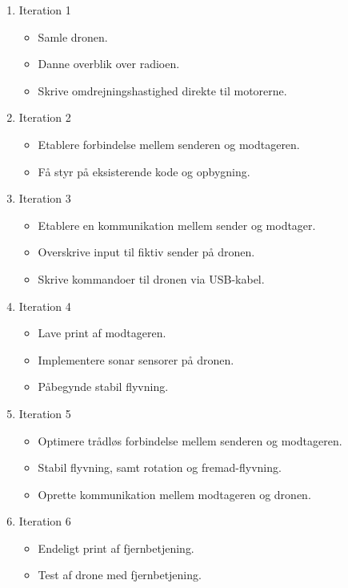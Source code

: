 \documentclass[Main]{subfiles}
\begin{document}
\vspace{-20pt}
\begin{enumerate}
\item[] Iteration 1
	\vspace{-10pt}
	\begin{itemize}
	\item Samle dronen.
	\item Danne overblik over radioen.
	\item Skrive omdrejningshastighed direkte til motorerne.
	\end{itemize}
	
\item[] Iteration 2
	\vspace{-10pt}
	\begin{itemize}
	\item Etablere forbindelse mellem senderen og modtageren.
	\item Få styr på eksisterende kode og opbygning.
	\end{itemize}
	
\item[] Iteration 3
	\vspace{-10pt}
	\begin{itemize}
	\item Etablere en kommunikation mellem sender og modtager.
	\item Overskrive input til fiktiv sender på dronen.
	\item Skrive kommandoer til dronen via USB-kabel.
	\end{itemize}

\item[] Iteration 4
	\vspace{-10pt}
	\begin{itemize}
	\item Lave print af modtageren.
	\item Implementere sonar sensorer på dronen.
	\item Påbegynde stabil flyvning.
	\end{itemize}
	
\item[] Iteration 5
	\vspace{-10pt}
	\begin{itemize}
	\item Optimere trådløs forbindelse mellem senderen og modtageren.
	\item Stabil flyvning, samt rotation og fremad-flyvning.
	\item Oprette kommunikation mellem modtageren og dronen.
	\end{itemize}
	
\item[] Iteration 6
	\vspace{-10pt}
	\begin{itemize}
	\item Endeligt print af fjernbetjening.
	\item Test af drone med fjernbetjening.
	\end{itemize}

\end{enumerate}
\end{document}
